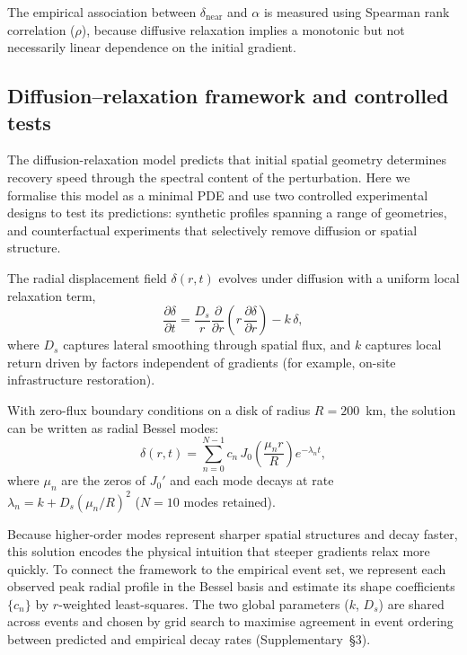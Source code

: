 \documentclass[11pt]{article}
\newcommand{\dnear}{\delta_{\mathrm{near}}}
\newcommand{\Ds}{D_s}
\newcommand{\rhosp}{\rho}
\begin{document}
The empirical association between $\dnear$ and $\alpha$ is measured using Spearman rank correlation ($\rhosp$), because diffusive relaxation implies a monotonic but not necessarily linear dependence on the initial gradient.

\subsection*{Diffusion--relaxation framework and controlled tests}

The diffusion-relaxation model predicts that initial spatial geometry determines recovery speed through the spectral content of the perturbation. Here we formalise this model as a minimal PDE and use two controlled experimental designs to test its predictions: synthetic profiles spanning a range of geometries, and counterfactual experiments that selectively remove diffusion or spatial structure.

The radial displacement field $\delta(r,t)$ evolves under diffusion with a uniform local relaxation term,
\begin{equation}
  \frac{\partial\delta}{\partial t}
    = \frac{\Ds}{r}\frac{\partial}{\partial r}
      \!\left(r\,\frac{\partial\delta}{\partial r}\right)
    - k\,\delta,
  \label{eq:pde}
\end{equation}
where $\Ds$ captures lateral smoothing through spatial flux, and $k$ captures local return driven by factors independent of gradients (for example, on-site infrastructure restoration).

With zero-flux boundary conditions on a disk of radius $R = 200$~km, the solution can be written as radial Bessel modes:
\begin{equation}
  \delta(r,t) = \sum_{n=0}^{N-1} c_n\,J_0\!\left(
    \frac{\mu_n r}{R}\right) e^{-\lambda_n t},
  \label{eq:bessel}
\end{equation}
where $\mu_n$ are the zeros of $J_0'$ and each mode decays at rate $\lambda_n = k + \Ds(\mu_n/R)^2$ ($N = 10$ modes retained). 

Because higher-order modes represent sharper spatial structures and decay faster, this solution encodes the physical intuition that steeper gradients relax more quickly. To connect the framework to the empirical event set, we represent each observed peak radial profile in the Bessel basis and estimate its shape coefficients $\{c_n\}$ by $r$-weighted least-squares. The two global parameters ($k$, $\Ds$) are shared across events and chosen by grid search to maximise agreement in event ordering between predicted and empirical decay rates (Supplementary~\S3).
\end{document}
